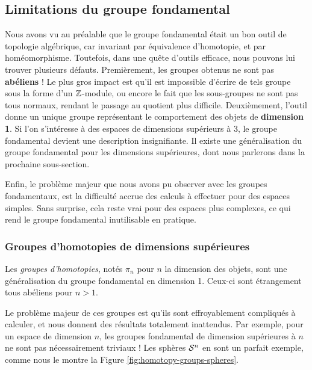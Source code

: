 \subsection{Limitations du groupe fondamental}

Nous avons vu au préalable que le groupe fondamental était un bon outil de topologie algébrique, car invariant par équivalence d'homotopie, et par homéomorphisme. Toutefois, dans une quête d'outils efficace, nous pouvons lui trouver plusieurs défauts. Premièrement, les groupes obtenus ne sont pas \textbf{abéliens} ! Le plus gros impact est qu'il est impossible d'écrire de tels groupe sous la forme d'un $\mathbb{Z}$-module, ou encore le fait que les sous-groupes ne sont pas tous normaux, rendant le passage au quotient plus difficile. Deuxièmement, l'outil donne un unique groupe représentant le comportement des objets de \textbf{dimension 1}. Si l'on s'intéresse à des espaces de dimensions supérieurs à 3, le groupe fondamental devient une description insignifiante. Il existe une généralisation du groupe fondamental pour les dimensions supérieures, dont nous parlerons dans la prochaine sous-section.

Enfin, le problème majeur que nous avons pu observer avec les groupes fondamentaux, est la difficulté accrue des calculs à effectuer pour des espaces simples. Sans surprise, cela reste vrai pour des espaces plus complexes, ce qui rend le groupe fondamental inutilisable en pratique.

\subsubsection{Groupes d'homotopies de dimensions supérieures}

Les \emph{groupes d'homotopies}, notés $\pi_n$ pour $n$ la dimension des objets, sont une généralisation du groupe fondamental en dimension 1. Ceux-ci sont étrangement tous abéliens pour $n>1$.

Le problème majeur de ces groupes est qu'ils sont effroyablement compliqués à calculer, et nous donnent des résultats totalement inattendus. Par exemple, pour un espace de dimension $n$, les groupes fondamental de dimension supérieures à $n$ ne sont pas nécessairement triviaux ! Les sphères $\mathcal{S}^{n}$ en sont un parfait exemple, comme nous le montre la Figure \ref{fig:homotopy-groups-spheres}.

